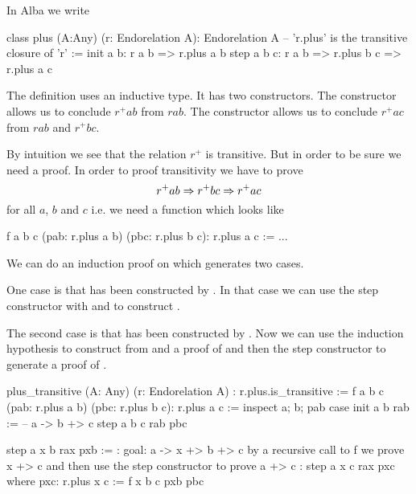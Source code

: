 In Alba we write

\begin{alba}
    class
        plus (A:Any) (r: Endorelation A): Endorelation A
            -- 'r.plus' is the transitive closure of 'r'
    :=
        init a b:
            r a b
            => r.plus a b
        step a b c:
            r a b
            => r.plus b c
            => r.plus a c
\end{alba}

The definition uses an inductive type. It has two constructors. The
 constructor allows us to conclude $r^+ a b$ from $r a b$.  The
 constructor allows us to conclude $r^+ a c$ from $r a b$ and $r^+
b c$.

By intuition we see that the relation $r^+$ is transitive. But in
order to be sure we need a proof. In order to proof transitivity we have to
prove
%
$$
 r^+ a b \Rightarrow r^+ b c \Rightarrow r^+ a c
$$
%
for all $a$, $b$ and $c$
i.e. we need a function which looks like
%
\begin{alba}
  f a b c (pab: r.plus a b) (pbc: r.plus b c): r.plus a c :=
    ...
\end{alba}
%
We can do an induction proof on  which generates two
cases.

One case is that  has been constructed
by . In that case we can use the step constructor with
 and  to construct .

The second case is that   has been constructed by . Now we can use the induction
hypothesis to construct from  and  a proof of  and then the step constructor to generate a proof of .


\begin{alba}
    plus_transitive
        (A: Any) (r: Endorelation A)
        : r.plus.is_transitive
    :=
        f a b c (pab: r.plus a b) (pbc: r.plus b c): r.plus a c :=
            inspect
                a; b; pab
            case
                init a b rab :=
                    -- a -> b +> c
                    step a b c rab pbc

                step a x b rax pxb :=
                    {: goal: a -> x +> b +> c
                       by a recursive call to f we prove x +> c
                       and then use the step constructor to prove a +> c :}
                    step a x c rax pxc
                    where
                        pxc: r.plus x c := f x b c pxb pbc
\end{alba}



